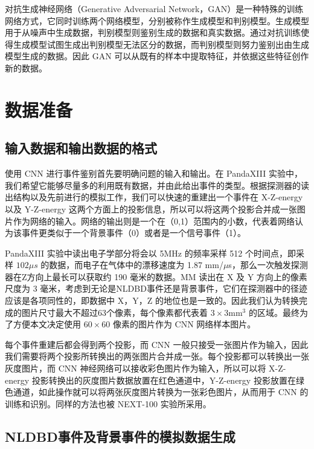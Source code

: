 对抗生成神经网络（Generative Adversarial Network，GAN）是一种特殊的训练网络方式，它同时训练两个网络模型，分别被称作生成模型和判别模型。生成模型用于从噪声中生成数据，判别模型则鉴别生成的数据和真实数据。通过对抗训练使得生成模型试图生成出判别模型无法区分的数据，而判别模型则努力鉴别出由生成模型生成的数据。因此 GAN 可以从既有的样本中提取特征，并依据这些特征创作新的数据。

\section{数据准备}
\label{section:data_prepare}

\subsection{输入数据和输出数据的格式}

使用 CNN 进行事件鉴别首先要明确问题的输入和输出。在 PandaXIII 实验中，我们希望它能够尽量多的利用既有数据，并由此给出事件的类型。根据探测器的读出结构以及先前进行的模拟工作，我们可以快速的重建出一个事件在 X-Z-energy 以及 Y-Z-energy 这两个方面上的投影信息，所以可以将这两个投影合并成一张图片作为网络的输入。网络的输出则是一个在（0,1）范围内的小数，代表着网络认为该事件更类似于一个背景事件（0）或者是一个信号事件（1）。

PandaXIII 实验中读出电子学部分将会以 5MHz 的频率采样 512 个时间点，即采样 $102\mu s$ 的数据，而电子在气体中的漂移速度为 1.87 mm/$\mu$s，那么一次触发探测器在Z方向上最长可以获取约 190 毫米的数据。MM 读出在 X 及 Y 方向上的像素尺度为 3 毫米，考虑到无论是NLDBD事件还是背景事件，它们在探测器中的径迹应该是各项同性的，即数据中 X，Y，Z 的地位也是一致的。因此我们认为转换完成的图片尺寸最大不超过63个像素，每个像素都代表着 $3\times 3$mm$^3$ 的区域。最终为了方便本文决定使用 $60\times60$ 像素的图片作为 CNN 网络样本图片。

每个事件重建后都会得到两个投影，而 CNN 一般只接受一张图片作为输入，因此我们需要将两个投影所转换出的两张图片合并成一张。每个投影都可以转换出一张灰度图片，而 CNN 神经网络可以接收彩色图片作为输入，所以可以将 X-Z-energy 投影转换出的灰度图片数据放置在红色通道中，Y-Z-energy 投影放置在绿色通道，如此操作就可以将两张灰度图片转换为一张彩色图片，从而用于 CNN 的训练和识别。同样的方法也被 NEXT-100 实验所采用\supercite{renner2017background}。

\subsection{NLDBD事件及背景事件的模拟数据生成}
\label{chapter:generate_nldbd}

